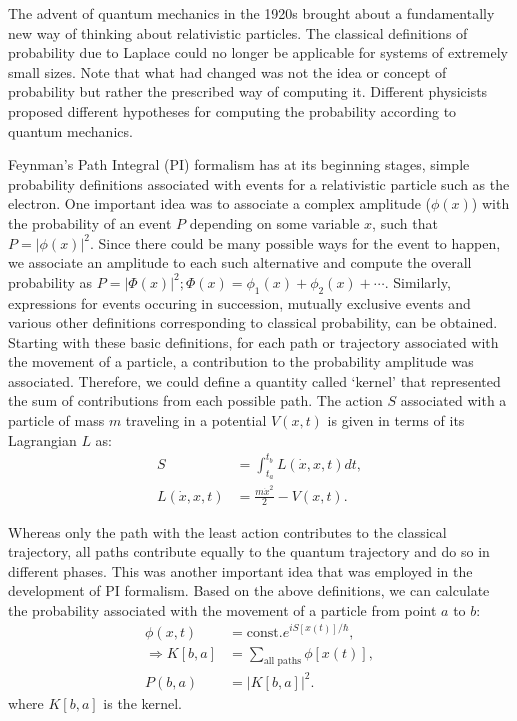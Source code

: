         The advent of quantum mechanics in the 1920s brought about a fundamentally new way of thinking about relativistic particles. The classical definitions of probability due to Laplace could no longer be applicable for systems of extremely small sizes. Note that what had changed was not the idea or concept of probability but rather the prescribed way of computing it. Different physicists proposed different hypotheses for computing the probability according to quantum mechanics.

        Feynman's Path Integral (PI) formalism has at its beginning stages, simple probability definitions associated with events for a relativistic particle such as the electron. One important idea was to associate a complex amplitude ($\phi(x)$) with the probability of an event $P$ depending on some variable $x$, such that $P = |\phi(x)|^2$. Since there could be many possible ways for the event to happen, we associate an amplitude to each such alternative and compute the overall probability as $P = |\Phi(x)|^2; \Phi(x) = \phi_1(x) + \phi_2(x) + \cdots$. Similarly, expressions for events occuring in succession, mutually exclusive events and various other definitions corresponding to classical probability, can be obtained. Starting with these basic definitions, for each path or trajectory associated with the movement of a particle, a contribution to the probability amplitude was associated. Therefore, we could define a quantity called `kernel' that represented the sum of contributions from each possible path. The action $S$ associated with a particle of mass $m$ traveling in a potential $V(x,t)$ is given in terms of its Lagrangian $L$ as:
        \begin{equation}
        \label{eq:action}
            \begin{aligned}
                S &= \displaystyle \int_{t_a}^{t_b} L(\dot{x},x,t) dt,\\
                L(\dot{x},x,t) &= \frac{m{\dot{x}}^2}{2} - V(x,t).
            \end{aligned}
        \end{equation}

        Whereas only the path with the least action contributes to the classical trajectory, all paths contribute equally to the quantum trajectory and do so in different phases. This was another important idea that was employed in the development of PI formalism. Based on the above definitions, we can calculate the probability associated with the movement of a particle from point $a$ to $b$:
        \begin{equation}
        \label{eq:quantum probability}
            \begin{aligned}
                \phi(x,t) &= \text{const.} e^{iS[x(t)]/\hbar},\\
                \Rightarrow K[b,a] &= \displaystyle\sum\limits_{\text{all paths}} \phi[x(t)],\\
                P(b,a) &= {|K[b,a]|}^2.
            \end{aligned}
        \end{equation}
        where $K[b,a]$ is the kernel.

